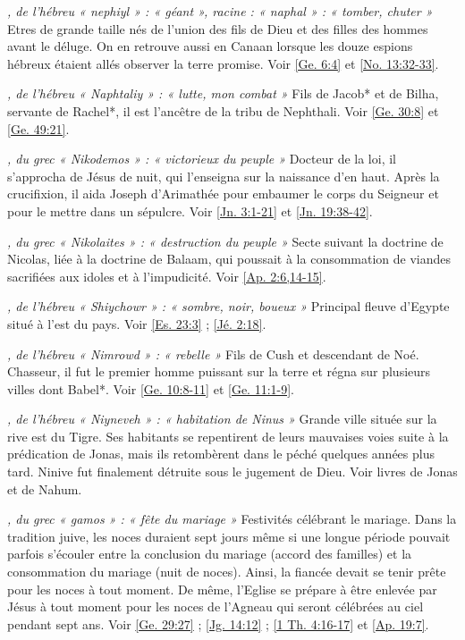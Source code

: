 \begin{multicols}{2}
\textit{, de l'hébreu « nephiyl » : « géant », racine : « naphal » : « tomber, chuter »}\newline
Etres de grande taille nés de l'union des fils de Dieu et des filles des hommes avant le déluge. On en retrouve aussi en Canaan lorsque les douze espions hébreux étaient allés observer la terre promise. Voir \vref{Ge. 6:4} et \vref{No. 13:32-33}.

\textit{, de l'hébreu « Naphtaliy » : « lutte, mon combat »}\newline
Fils de Jacob* et de Bilha, servante de Rachel*, il est l'ancêtre de la tribu de Nephthali. Voir \vref{Ge. 30:8} et \vref{Ge. 49:21}.

\textit{, du grec « Nikodemos » : « victorieux du peuple »}\newline
Docteur de la loi, il s'approcha de Jésus de nuit, qui l'enseigna sur la naissance d'en haut. Après la crucifixion, il aida Joseph d'Arimathée pour embaumer le corps du Seigneur et pour le mettre dans un sépulcre. Voir \vref{Jn. 3:1-21} et \vref{Jn. 19:38-42}.

\textit{, du grec « Nikolaites » : « destruction du peuple »}\newline
Secte suivant la doctrine de Nicolas, liée à la doctrine de Balaam, qui poussait à la consommation de viandes sacrifiées aux idoles et à l'impudicité. Voir \vref{Ap. 2:6,14-15}.

\textit{, de l'hébreu « Shiychowr » : « sombre, noir, boueux »}\newline
Principal fleuve d'Egypte situé à l'est du pays. Voir \vref{Es. 23:3} ; \vref{Jé. 2:18}.

\textit{, de l'hébreu « Nimrowd » : « rebelle »}\newline
Fils de Cush et descendant de Noé. Chasseur, il fut le premier homme puissant sur la terre et régna sur plusieurs villes dont Babel*. Voir \vref{Ge. 10:8-11} et \vref{Ge. 11:1-9}.

\textit{, de l'hébreu « Niyneveh » : « habitation de Ninus »}\newline
Grande ville située sur la rive est du Tigre. Ses habitants se repentirent de leurs mauvaises voies suite à la prédication de Jonas, mais ils retombèrent dans le péché quelques années plus tard. Ninive fut finalement détruite sous le jugement de Dieu. Voir livres de Jonas et de Nahum.

\textit{, du grec « gamos » : « fête du mariage »}\newline
Festivités célébrant le mariage. Dans la tradition juive, les noces duraient sept jours même si une longue période pouvait parfois s'écouler entre la conclusion du mariage (accord des familles) et la consommation du mariage (nuit de noces). Ainsi, la fiancée devait se tenir prête pour les noces à tout moment. De même, l'Eglise se prépare à être enlevée par Jésus à tout moment pour les noces de l'Agneau qui seront célébrées au ciel pendant sept ans. Voir \vref{Ge. 29:27} ; \vref{Jg. 14:12} ; \vref{1 Th. 4:16-17} et \vref{Ap. 19:7}.


\end{multicols}
